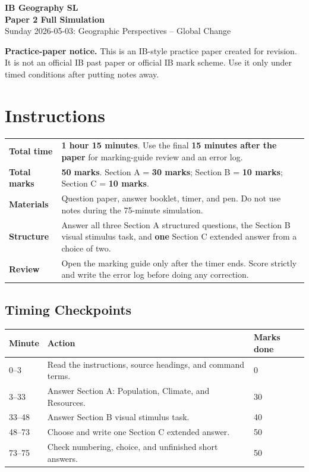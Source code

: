 \documentclass[11pt,a4paper]{article}
\newcommand{\term}[1]{\textcolor{HeadingBlue}{\textbf{#1}}}
\newcommand{\boxnote}[3]{%
\noindent\colorbox{#1}{%
  \begin{minipage}{0.965\textwidth}
  \sffamily
  \textbf{\textcolor{HeadingBlue}{#2}} #3
  \end{minipage}
}}
\begin{document}
\begin{center}
  {\sffamily\bfseries\color{HeadingBlue}\LARGE IB Geography SL}\\[0.2em]
  {\sffamily\bfseries\color{AccentTeal}\Large Paper 2 Full Simulation}\\[0.3em]
  {\sffamily\color{TextInk}Sunday 2026-05-03: Geographic Perspectives -- Global Change}
\end{center}

\vspace{0.3em}

\boxnote{SoftRed}{Practice-paper notice.}{This is an IB-style practice paper
created for revision. It is not an official IB past paper or official IB mark
scheme. Use it only under timed conditions after putting notes away.}

\section{Instructions}

\begin{tabularx}{\textwidth}{L{0.24\textwidth}Y}
\toprule
\textbf{Total time} & \term{1 hour 15 minutes}. Use the final
\term{15 minutes after the paper} for marking-guide review and an error log. \\
\textbf{Total marks} & \term{50 marks}. Section A = \term{30 marks};
Section B = \term{10 marks}; Section C = \term{10 marks}. \\
\textbf{Materials} & Question paper, answer booklet, timer, and pen. Do not
use notes during the 75-minute simulation. \\
\textbf{Structure} & Answer all three Section A structured questions, the
Section B visual stimulus task, and \term{one} Section C extended answer from
a choice of two. \\
\textbf{Review} & Open the marking guide only after the timer ends. Score
strictly and write the error log before doing any correction. \\
\bottomrule
\end{tabularx}

\subsection{Timing Checkpoints}

\begin{tabularx}{\textwidth}{L{0.18\textwidth}Y L{0.18\textwidth}}
\toprule
\textbf{Minute} & \textbf{Action} & \textbf{Marks done} \\
--3 & Read the instructions, source headings, and command terms. & 0 \\
3--33 & Answer Section A: Population, Climate, and Resources. & 30 \\
33--48 & Answer Section B visual stimulus task. & 40 \\
48--73 & Choose and write one Section C extended answer. & 50 \\
73--75 & Check numbering, choice, and unfinished short answers. & 50 \\
\bottomrule
\end{tabularx}
\end{document}
